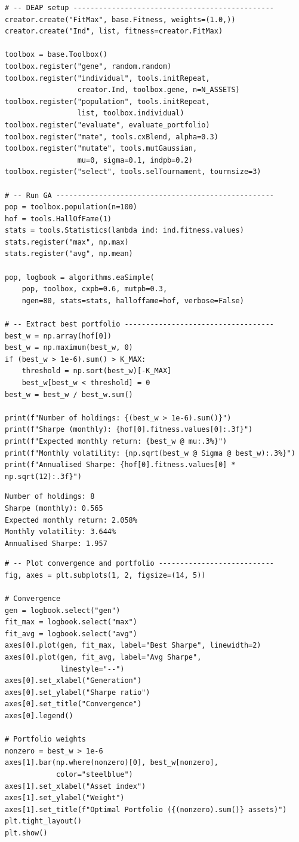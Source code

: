 \begin{verbatim}
# -- DEAP setup -----------------------------------------------
creator.create("FitMax", base.Fitness, weights=(1.0,))
creator.create("Ind", list, fitness=creator.FitMax)

toolbox = base.Toolbox()
toolbox.register("gene", random.random)
toolbox.register("individual", tools.initRepeat,
                 creator.Ind, toolbox.gene, n=N_ASSETS)
toolbox.register("population", tools.initRepeat,
                 list, toolbox.individual)
toolbox.register("evaluate", evaluate_portfolio)
toolbox.register("mate", tools.cxBlend, alpha=0.3)
toolbox.register("mutate", tools.mutGaussian,
                 mu=0, sigma=0.1, indpb=0.2)
toolbox.register("select", tools.selTournament, tournsize=3)

# -- Run GA ---------------------------------------------------
pop = toolbox.population(n=100)
hof = tools.HallOfFame(1)
stats = tools.Statistics(lambda ind: ind.fitness.values)
stats.register("max", np.max)
stats.register("avg", np.mean)

pop, logbook = algorithms.eaSimple(
    pop, toolbox, cxpb=0.6, mutpb=0.3,
    ngen=80, stats=stats, halloffame=hof, verbose=False)

# -- Extract best portfolio -----------------------------------
best_w = np.array(hof[0])
best_w = np.maximum(best_w, 0)
if (best_w > 1e-6).sum() > K_MAX:
    threshold = np.sort(best_w)[-K_MAX]
    best_w[best_w < threshold] = 0
best_w = best_w / best_w.sum()

print(f"Number of holdings: {(best_w > 1e-6).sum()}")
print(f"Sharpe (monthly): {hof[0].fitness.values[0]:.3f}")
print(f"Expected monthly return: {best_w @ mu:.3%}")
print(f"Monthly volatility: {np.sqrt(best_w @ Sigma @ best_w):.3%}")
print(f"Annualised Sharpe: {hof[0].fitness.values[0] * np.sqrt(12):.3f}")
\end{verbatim}

\begin{verbatim}
Number of holdings: 8
Sharpe (monthly): 0.565
Expected monthly return: 2.058%
Monthly volatility: 3.644%
Annualised Sharpe: 1.957
\end{verbatim}

\begin{verbatim}
# -- Plot convergence and portfolio ---------------------------
fig, axes = plt.subplots(1, 2, figsize=(14, 5))

# Convergence
gen = logbook.select("gen")
fit_max = logbook.select("max")
fit_avg = logbook.select("avg")
axes[0].plot(gen, fit_max, label="Best Sharpe", linewidth=2)
axes[0].plot(gen, fit_avg, label="Avg Sharpe",
             linestyle="--")
axes[0].set_xlabel("Generation")
axes[0].set_ylabel("Sharpe ratio")
axes[0].set_title("Convergence")
axes[0].legend()

# Portfolio weights
nonzero = best_w > 1e-6
axes[1].bar(np.where(nonzero)[0], best_w[nonzero],
            color="steelblue")
axes[1].set_xlabel("Asset index")
axes[1].set_ylabel("Weight")
axes[1].set_title(f"Optimal Portfolio ({(nonzero).sum()} assets)")
plt.tight_layout()
plt.show()
\end{verbatim}

